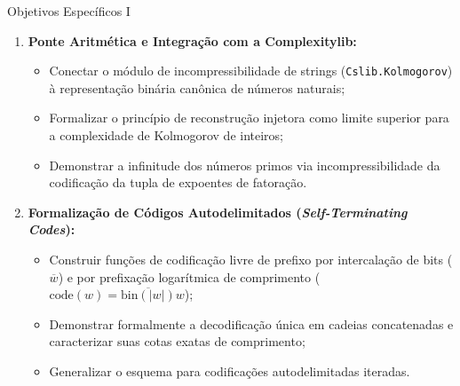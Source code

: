 \documentclass[10pt, aspectratio=43]{beamer}
\begin{document}
\begin{frame}{Objetivos Específicos I}
\begin{enumerate}
    \item \textbf{Ponte Aritmética e Integração com a Complexitylib:}
    \begin{itemize}
        \item Conectar o módulo de incompressibilidade de strings (\texttt{Cslib.Kolmogorov}) à representação binária canônica de números naturais;
        \item Formalizar o princípio de reconstrução injetora como limite superior para a complexidade de Kolmogorov de inteiros;
        \item Demonstrar a infinitude dos números primos via incompressibilidade da codificação da tupla de expoentes de fatoração.
    \end{itemize}
    \medskip
    \item \textbf{Formalização de Códigos Autodelimitados (\textit{Self-Terminating Codes}):}
    \begin{itemize}
        \item Construir funções de codificação livre de prefixo por intercalação de bits ($\overline{w}$) e por prefixação logarítmica de comprimento ($\text{code}(w) = \overline{\text{bin}(|w|)}w$);
        \item Demonstrar formalmente a decodificação única em cadeias concatenadas e caracterizar suas cotas exatas de comprimento;
        \item Generalizar o esquema para codificações autodelimitadas iteradas.
    \end{itemize}
\end{enumerate}
\end{frame}
\end{document}
